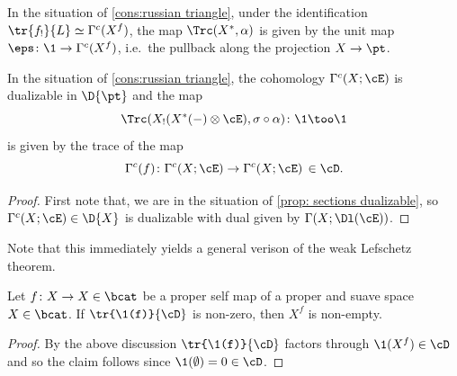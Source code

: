 \begin{lem}
  In the situation of \cref{cons:russian triangle}, under the identification
  $\tr{f_{!}}{L}\simeq \Gamma^{c}(X^{f})$, the map $\Trc(X^{\ast},\alpha)$ is given by the unit
  map $\eps\colon \1 \to \Gamma^{c}(X^{f})$, i.e.~the pullback along the projection $X\to \pt$.
\end{lem}

\begin{lem}
  In the situation of \cref{cons:russian triangle}, the cohomology $\Gamma^{c}(X;\cE)$ is
  dualizable in $\D{\pt}$ and the map 
  \[\Trc(X_{!}(X^{\ast}(-)\otimes \cE), \sigma\circ \alpha)\colon \1\too \1\]
  is  given by the trace of the map
  \[\Gamma^{c}(f)\colon \Gamma^{c}(X;\cE)\to \Gamma^{c}(X;\cE)\,\in \cD.\]
\end{lem}
\begin{proof}
First note that, we are in the situation of \cref{prop: sections dualizable}, so $\Gamma^{c}(X;\cE)\in \D{X}$ is dualizable with dual given by $\Gamma(X;\Dl(\cE))$.
\end{proof}

Note that this immediately yields a general verison of the weak Lefschetz theorem.

\begin{cor}
Let $f\colon X\to X \in \bcat$ be a proper self map of a proper and suave space $X\in \bcat$.
If $\tr{\1(f)}{\cD}$ is non-zero, then $X^{f}$ is non-empty.
\end{cor}
\begin{proof}
  By the above discussion $\tr{\1(f)}{\cD}$ factors through $\1(X^{f})\in \cD$ and so the claim
  follows since $\1(\emptyset)=0\in \cD$.
\end{proof}

